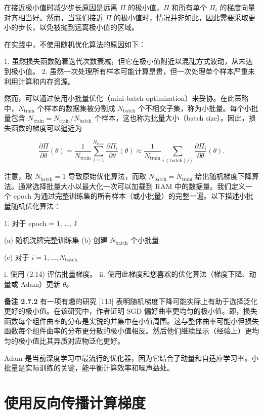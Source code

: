 在接近极小值时减少步长原因是远离 $\Pi$ 的极小值，$\Pi$ 和所有单个 $\Pi_i$ 的梯度向量对齐相当好。然而，当我们接近 $\Pi$ 的极小值时，情况并非如此，因此需要采取更小的步长，以免被抛到远离极小值的区域。

在实践中，不使用随机优化算法的原因如下：

1. 虽然损失函数随着迭代次数衰减，但它在极小值附近以混乱方式波动，从未达到极小值。
2. 虽然一次处理所有样本可能计算昂贵，但一次处理单个样本严重未利用计算和内存资源。

然而，可以通过使用小批量优化（mini-batch optimization）来妥协。在此策略中，$N_{\text{train}}$ 个样本的数据集被分割成 $N_{\text{batch}}$ 个不相交子集，称为小批量。每个小批量包含 $N_{\text{train}} = N_{\text{train}} / N_{\text{batch}}$ 个样本，这也称为批量大小（batch size）。因此，损失函数的梯度可以逼近为

\[
\frac{\partial \Pi}{\partial \theta}(\theta) = \frac{1}{N_{\text{train}}} \sum_{i=1}^{N_{\text{train}}} \frac{\partial \Pi_i}{\partial \theta}(\theta) \approx \frac{1}{N_{\text{train}}} \sum_{i \in \text{batch}(j)} \frac{\partial \Pi_i}{\partial \theta}(\theta).
\]

注意，取 $N_{\text{batch}} = 1$ 导致原始优化算法，而取 $N_{\text{batch}} = N_{\text{train}}$ 给出随机梯度下降算法。通常选择批量大小以最大化一次可以加载到 RAM 中的数据量。我们定义一个 epoch 为通过完整训练集的所有样本（或小批量）的完整一遍。以下描述小批量随机优化算法：

1. 对于 epoch = 1, \dots, J

(a) 随机洗牌完整训练集
(b) 创建 $N_{\text{batch}}$ 个小批量

(c) 对于 $i = 1, \dots, N_{\text{batch}}$

i. 使用 (2.14) 评估批量梯度。
ii. 使用此梯度和您喜欢的优化算法（梯度下降、动量或 Adam）更新 $\theta$。

\textbf{备注 2.7.2} 有一项有趣的研究 [113] 表明随机梯度下降可能实际上有助于选择泛化更好的极小值。在该研究中，作者证明 SGD 偏好曲率更均匀的极小值。即，损失函数每个组件曲率的分布是尖锐的并集中在小值周围。这与整体曲率可能小但损失函数每个组件曲率的分布更分散的极小值相反。然后他们继续显示（经验上）更均匀的极小值比其异质对应物泛化更好。

\begin{mycomment}
Adam 是当前深度学习中最流行的优化器，因为它结合了动量和自适应学习率。小批量是实际训练的关键，能平衡计算效率和噪声益处。
\end{mycomment}

\section{使用反向传播计算梯度}

